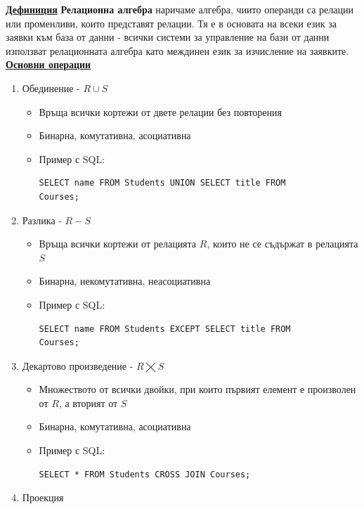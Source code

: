 \documentclass{article}
\begin{document}
\textbf{\underline{Дефиниция}}
\textbf{Релационна алгебра} наричаме алгебра, чиито операнди са релации или променливи, които представят релации. Тя е в основата на
всеки език за заявки към база от данни - всички системи за управление на бази от данни използват релационната алгебра като междинен език
за изчисление на заявките. \newline\newline
\textbf{\underline{Основни операции}}
\begin{enumerate}
    \item Обединение - $R \cup S$
        \begin{itemize}
            \item Връща всички кортежи от двете релации без повторения
            \item Бинарна, комутативна, асоциативна
            \item Пример с SQL:
\begin{lstlisting}[style=sql]
SELECT name FROM Students UNION SELECT title FROM
Courses;
\end{lstlisting}
        \end{itemize}
    \item Разлика - $R - S$
        \begin{itemize}
            \item Връща всички кортежи от релацията $R$, които не се съдържат в релацията $S$
            \item Бинарна, некомутативна, неасоциативна
            \item Пример с SQL:
\begin{lstlisting}[style=sql]
SELECT name FROM Students EXCEPT SELECT title FROM
Courses;
\end{lstlisting}
        \end{itemize}
    \item Декартово произведение - $R \bigtimes S$
        \begin{itemize}
            \item Множеството от всички двойки, при които първият елемент е произволен от $R$, а вторият от $S$
            \item Бинарна, комутативна, асоциативна
            \item Пример с SQL:
\begin{lstlisting}[style=sql]
SELECT * FROM Students CROSS JOIN Courses;
\end{lstlisting}            
        \end{itemize}
    \item Проекция

\end{enumerate}
\end{document}
